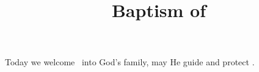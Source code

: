 \documentclass[12pt]{article}
\title{Baptism of}
\author{\peopleforenames}
\begin{document}
\maketitle
\thispagestyle{empty} 

Today we welcome \peoplename\ into God's family, may He guide and protect \them. 
\end{document}
